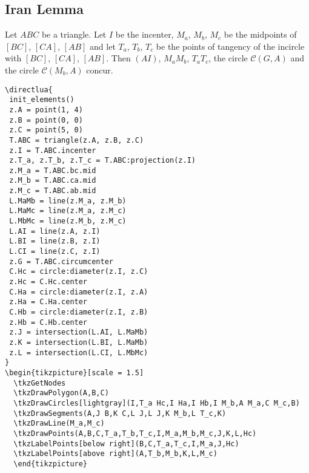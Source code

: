 \subsection{Iran Lemma}


Let $ABC$ be a triangle. Let $I$ be the incenter, $M_a$, $M_b$, $M_c$ be the midpoints of $[BC]$, $[CA]$, $[AB]$ and let $T_a$, $T_b$, $T_c$ be the points of tangency of the incircle with $[BC]$, $[CA]$, $[AB]$. Then $(AI)$, $M_aM_b$, $T_aT_c$, the circle $\mathcal{C}(G,A)$  and the circle $\mathcal{C}(M_b,A)$ concur.

\begin{verbatim}
\directlua{
 init_elements()
 z.A = point(1, 4)
 z.B = point(0, 0)
 z.C = point(5, 0)
 T.ABC = triangle(z.A, z.B, z.C)
 z.I = T.ABC.incenter
 z.T_a, z.T_b, z.T_c = T.ABC:projection(z.I)
 z.M_a = T.ABC.bc.mid
 z.M_b = T.ABC.ca.mid
 z.M_c = T.ABC.ab.mid
 L.MaMb = line(z.M_a, z.M_b)
 L.MaMc = line(z.M_a, z.M_c)
 L.MbMc = line(z.M_b, z.M_c)
 L.AI = line(z.A, z.I)
 L.BI = line(z.B, z.I)
 L.CI = line(z.C, z.I)
 z.G = T.ABC.circumcenter
 C.Hc = circle:diameter(z.I, z.C)
 z.Hc = C.Hc.center
 C.Ha = circle:diameter(z.I, z.A)
 z.Ha = C.Ha.center
 C.Hb = circle:diameter(z.I, z.B)
 z.Hb = C.Hb.center
 z.J = intersection(L.AI, L.MaMb)
 z.K = intersection(L.BI, L.MaMb)
 z.L = intersection(L.CI, L.MbMc)
}
\begin{tikzpicture}[scale = 1.5]
  \tkzGetNodes
  \tkzDrawPolygon(A,B,C)
  \tkzDrawCircles[lightgray](I,T_a Hc,I Ha,I Hb,I M_b,A M_a,C M_c,B)
  \tkzDrawSegments(A,J B,K C,L J,L J,K M_b,L T_c,K)
  \tkzDrawLine(M_a,M_c)
  \tkzDrawPoints(A,B,C,T_a,T_b,T_c,I,M_a,M_b,M_c,J,K,L,Hc)
  \tkzLabelPoints[below right](B,C,T_a,T_c,I,M_a,J,Hc)
  \tkzLabelPoints[above right](A,T_b,M_b,K,L,M_c)
  \end{tikzpicture}
\end{verbatim}



